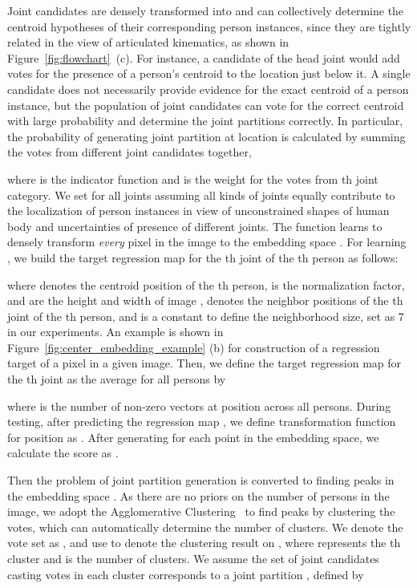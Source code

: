 \documentclass[10pt,twocolumn,letterpaper]{article}
\begin{document}
Joint candidates are densely transformed into  and can collectively determine  the centroid hypotheses of their corresponding person instances,  since they are tightly related in the view of articulated kinematics, as shown in Figure~\ref{fig:flowchart}~(c). For instance, a candidate of the head joint  would add votes for the presence of a person's centroid to the location just below it. A single candidate does not necessarily provide evidence for the exact centroid of a person instance, but the population of joint candidates can vote for the correct centroid with large probability and determine the joint partitions correctly.
In particular, the probability of generating joint partition  at location  is calculated by summing the votes from different joint candidates together, \ie

where
 is the indicator function and  is the weight for the votes from th joint category. We set  for all joints assuming all kinds of joints equally contribute to the localization of person instances in view of unconstrained shapes of human body and uncertainties of presence of different joints. The  function  learns to densely transform  \emph{every} pixel in the image to  the embedding space . For learning , we build  the target regression map   for the th joint of the th person as follows:


where  denotes the centroid position of the th person,  is the normalization factor,  and  are the height and width of image
,  denotes the neighbor positions of the th joint of the th person, and  is
a constant to define the neighborhood size, set as 7 in our experiments. An example is shown in Figure~\ref{fig:center_embedding_example} (b) for construction of a regression target of a pixel in a given image.
Then, we define the target regression map  for the th joint as the average for all persons by

where  is the number of non-zero vectors at position  across all persons. During testing, after predicting the  regression map ,
we define transformation function  for position  as .
After generating  for each point in the embedding space, we calculate the score  as .

Then the problem of joint partition generation is converted to finding peaks in the  embedding space . As there are no  priors on the number of persons in the image,  we adopt the  Agglomerative Clustering~\cite{bourdev2009poselets} to find  peaks by clustering the  votes, which  can automatically determine the number of clusters. We denote the vote set as , and use  to denote the clustering result on , where  represents the th cluster and  is the number of clusters. We assume the set of joint candidates casting votes in each cluster corresponds to a joint partition , defined by
\end{document}
